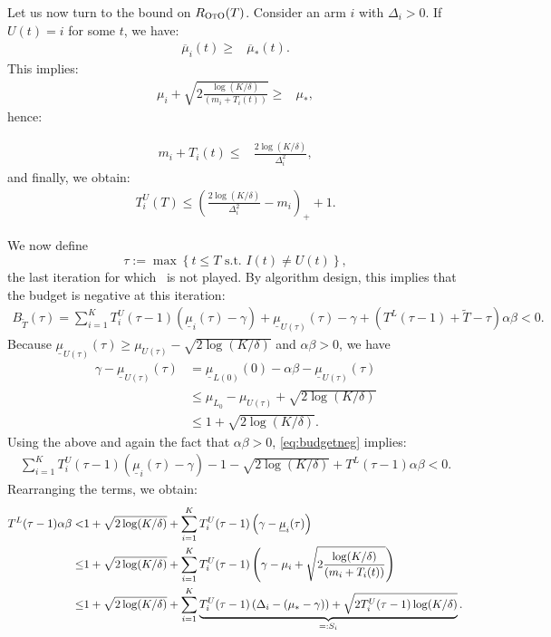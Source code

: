Let us now turn to the bound on $R_\textsc{OtO}(T)$. Consider an arm $i$ with $\Delta_i>0$. If $U(t)=i$ for some $t$, we have:
\begin{align*}
    \overline{\mu}_i(t)\geq& \overline{\mu}_*(t).
\end{align*}
This implies:
\begin{align*}
    \mu_i+\sqrt{2\frac{\log(K/\delta)}{(m_i+T_i(t))}}\geq& \mu_*,
\end{align*}
hence:

\begin{align*}
  m_i+T_i(t)\leq& \frac{2\log(K/\delta)}{\Delta_i^2},
\end{align*}
and finally, we obtain:
\begin{align}\label{eq:T_i^T}
T_i^U(T)\leq \left(\frac{2\log(K/\delta)}{\Delta_i^2}-m_i\right)_++1.
\end{align}

We now define
\[
\tau:= \max \left\{t\leq T \text{ s.t. } I(t)\neq U(t) \right\},
\]
the last iteration for which \algucb\ is not played. By algorithm design, this implies that the budget is negative at this iteration:
\begin{align}\label{eq:budgetneg}
B_{\tilde{T}}(\tau)=\sum_{i=1}^{K}T_i^U(\tau-1)(\underline{\mu}_{i}(\tau)-\gamma)+\underline{\mu}_{U(\tau)}(\tau)-\gamma+(T^L(\tau-1)+\tilde{T}-\tau)\alpha \beta<0.
\end{align}
Because $\underline{\mu}_{U(\tau)}(\tau)\ge \mu_{U(\tau)}-\sqrt{2\log(K/\delta)}$ and $\alpha \beta >0$, we have
 \begin{align*}
 \gamma-\underline{\mu}_{U(\tau)}(\tau)&=\underline{\mu}_{L(0)}(0)-\alpha\beta - \underline{\mu}_{U(\tau)}(\tau)\\
 &\le \mu_{L_0} -\mu_{U(\tau)} + \sqrt{2\log(K/\delta)}\\
 &\le 1+\sqrt{2\log(K/\delta)}.
 \end{align*}
 Using the above and again the fact that $\alpha \beta >0$, \eqref{eq:budgetneg} implies: 
\begin{align*}
 \sum_{i=1}^{K}T_i^U(\tau-1)(\underline{\mu}_{i}(\tau)-\gamma)-1-\sqrt{2\log(K/\delta)}+T^L(\tau-1)\alpha \beta<0.
\end{align*}
Rearranging the terms, we obtain:
\begin{align}
T^L(\tau-1) \alpha\beta< &1+\sqrt{2\log(K/\delta)}+\sum_{i=1}^K T^U_i(\tau-1)\left(\gamma-\underline{\mu}_{i}(\tau)\right)\notag\\
\leq &1+\sqrt{2\log(K/\delta)}+\sum_{i=1}^K T^U_i(\tau-1)\left(\gamma-\mu_i+\sqrt{2\frac{\log(K/\delta)}{(m_i+T_i(t))}}\right)\notag\\
\leq& 1+\sqrt{2\log(K/\delta)}+\sum_{i=1}^K \underbrace{T^U_i(\tau-1)\left(\Delta_i-(\mu_*-\gamma)\right)+\sqrt{2 T^U_i(\tau-1)\log(K/\delta)}}_{=:S_i}.\label{eq:boundT0}
\end{align}

